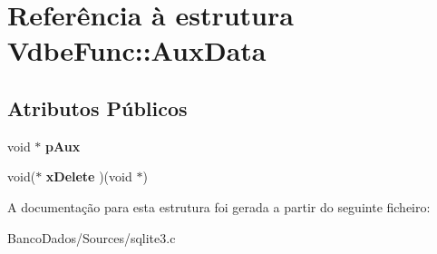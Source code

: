 \hypertarget{struct_vdbe_func_1_1_aux_data}{\section{Referência à estrutura Vdbe\-Func\-:\-:Aux\-Data}
\label{struct_vdbe_func_1_1_aux_data}
}
\subsection*{Atributos Públicos}
\begin{DoxyCompactItemize}
\item 
\hypertarget{struct_vdbe_func_1_1_aux_data_ad2ceeac1dec76bbb661f6418ec582539}{void $\ast$ {\bfseries p\-Aux}}\label{struct_vdbe_func_1_1_aux_data_ad2ceeac1dec76bbb661f6418ec582539}

\item 
\hypertarget{struct_vdbe_func_1_1_aux_data_a6742f89d0634b5fc6684f245bac76fd5}{void($\ast$ {\bfseries x\-Delete} )(void $\ast$)}\label{struct_vdbe_func_1_1_aux_data_a6742f89d0634b5fc6684f245bac76fd5}

\end{DoxyCompactItemize}


A documentação para esta estrutura foi gerada a partir do seguinte ficheiro\-:\begin{DoxyCompactItemize}
\item 
Banco\-Dados/\-Sources/sqlite3.\-c\end{DoxyCompactItemize}
